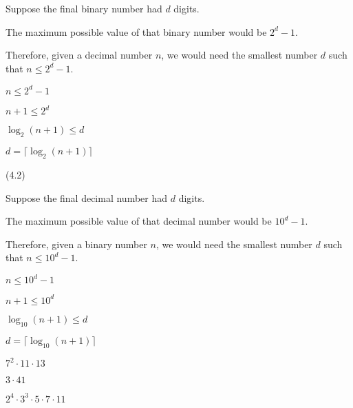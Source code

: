 \documentclass{exam}
\begin{document}
\begin{questions}
\begin{center}
Suppose the final binary number had \(d\) digits.

The maximum possible value of that binary number would be \(2^d - 1\).

Therefore, given a decimal number \(n\), we would need the smallest number \(d\) such that \(n \leq 2^d - 1\).

\(n \leq 2^d - 1\)

\(n + 1 \leq 2^d\)

\(\log_2(n+1) \leq d\)

\(d = \lceil \log_2(n+1) \rceil\)

\end{center}


 (4.2)

\begin{center}
Suppose the final decimal number had \(d\) digits.

The maximum possible value of that decimal number would be \(10^d - 1\).

Therefore, given a binary number \(n\), we would need the smallest number \(d\) such that \(n \leq 10^d - 1\).

\(n \leq 10^d - 1\)

\(n + 1 \leq 10^d\)

\(\log_{10}(n+1) \leq d\)

\(d = \lceil \log_{10}(n+1) \rceil\)

\end{center}

\begin{subparts}

\begin{center} \( 7^2 \cdot 11 \cdot 13 \) \end{center}


\begin{center} \( 3 \cdot 41 \) \end{center}


\begin{center} \( 2^4 \cdot 3^3 \cdot 5 \cdot 7 \cdot 11 \) \end{center}



\end{subparts}
\end{questions}
\end{document}

